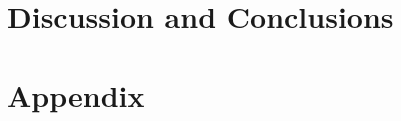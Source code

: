 \documentclass[%
 amsmath,amssymb,
 aps,
 prc
]{revtex4-1}
\begin{document}


\section{Discussion and Conclusions}
\label{conclude}



\section{Appendix}
\label{sec:Appendix}



\clearpage %
{}

\end{document}
